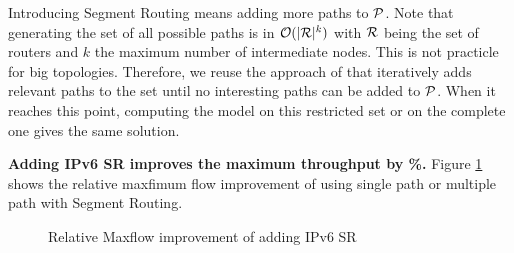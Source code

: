 Introducing Segment Routing means adding more paths to $\P$.
Note that generating the set of all possible paths is in $\O(|\R|^k)$
with $\R$ being the set of routers and $k$ the maximum number of intermediate nodes.
This is not practicle for big topologies.
Therefore, we reuse the approach of \cite{cg4sr} that iteratively adds relevant paths to the set
until no interesting paths can be added to $\P$.
When it reaches this point, computing the model on this restricted set or on the complete one
gives the same solution.

\textbf{Adding IPv6 SR improves the maximum throughput by \%.}
Figure \ref{fig:maxflow-theory} shows the relative maxfimum flow improvement of using single path or multiple path with Segment Routing. 

\begin{figure}
	\centering
	\caption{Relative Maxflow improvement of adding IPv6 SR}
	\label{fig:maxflow-theory}
\end{figure}






